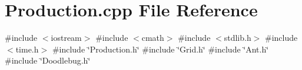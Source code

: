 \section{Production.\+cpp File Reference}
\label{Production_8cpp}
{\ttfamily \#include $<$iostream$>$}\newline
{\ttfamily \#include $<$cmath$>$}\newline
{\ttfamily \#include $<$stdlib.\+h$>$}\newline
{\ttfamily \#include $<$time.\+h$>$}\newline
{\ttfamily \#include \char`\"{}Production.\+h\char`\"{}}\newline
{\ttfamily \#include \char`\"{}Grid.\+h\char`\"{}}\newline
{\ttfamily \#include \char`\"{}Ant.\+h\char`\"{}}\newline
{\ttfamily \#include \char`\"{}Doodlebug.\+h\char`\"{}}\newline

